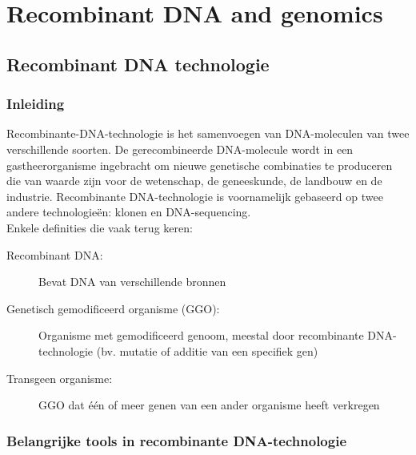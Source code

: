 \documentclass[a4paper,kul]{kulakarticle} %
\begin{document}
\newpage
\section{Recombinant DNA and genomics}
\subsection{Recombinant DNA technologie}
\subsubsection{Inleiding}
Recombinante-DNA-technologie is het samenvoegen van DNA-moleculen van twee verschillende soorten. De gerecombineerde DNA-molecule wordt in een gastheerorganisme ingebracht om nieuwe genetische combinaties te produceren die van waarde zijn voor de wetenschap, de geneeskunde, de landbouw en de industrie. Recombinante DNA-technologie is voornamelijk gebaseerd op twee andere technologieën: klonen en DNA-sequencing.\\
Enkele definities die vaak terug keren:
\begin{description}
	\item[Recombinant DNA:] Bevat DNA van verschillende bronnen
	\item[Genetisch gemodificeerd organisme (GGO):] Organisme met gemodificeerd genoom, meestal door recombinante DNA-technologie (bv. mutatie of additie van een specifiek gen)
	\item[Transgeen organisme:] GGO dat één of meer genen van een ander organisme heeft verkregen 
\end{description}
\subsubsection{Belangrijke tools in recombinante DNA-technologie}
\end{document}
